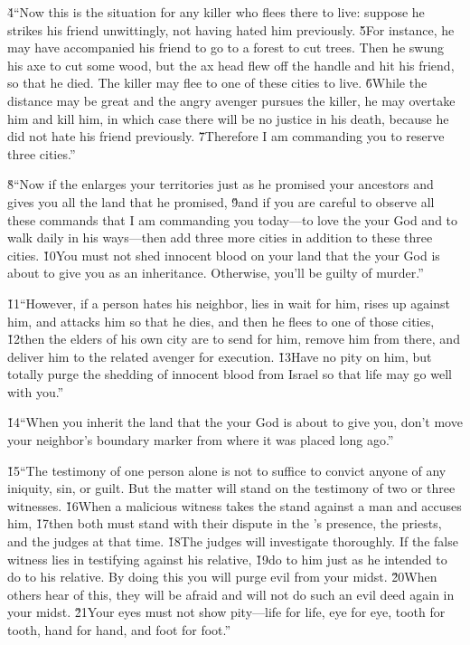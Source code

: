 \v{4}``Now this is the situation for any killer who flees there to live: suppose he strikes his friend unwittingly, not having hated him previously. \v{5}For instance, he may have accompanied his friend to go to a forest to cut trees. Then he swung his axe to cut some wood, but the ax head flew off the handle and hit his friend, so that he died. The killer may flee to one of these cities to live. \v{6}While the distance may be great and the angry avenger pursues the killer, he may overtake him and kill him, in which case there will be no justice in his death, because he did not hate his friend previously. \v{7}Therefore I am commanding you to reserve three cities.''

\v{8}``Now if the  enlarges your territories just as he promised your ancestors and gives you all the land that he promised, \v{9}and if you are careful to observe all these commands that I am commanding you today---to love the  your God and to walk daily in his ways---then add three more cities in addition to these three cities. \v{10}You must not shed innocent blood on your land that the  your God is about to give you as an inheritance. Otherwise, you'll be guilty of murder.''

\v{11}``However, if a person hates his neighbor, lies in wait for him, rises up against him, and attacks him so that he dies, and then he flees to one of those cities, \v{12}then the elders of his own city are to send for him, remove him from there, and deliver him to the related avenger for execution. \v{13}Have no pity on him, but totally purge the shedding of innocent blood from Israel so that life may go well with you.''

\v{14}``When you inherit the land that the  your God is about to give you, don't move your neighbor's boundary marker from where it was placed long ago.''

\v{15}``The testimony of one person alone is not to suffice to convict anyone of any iniquity, sin, or guilt. But the matter will stand on the testimony of two or three witnesses. \v{16}When a malicious witness takes the stand against a man and accuses him, \v{17}then both must stand with their dispute in the 's presence, the priests, and the judges at that time. \v{18}The judges will investigate thoroughly. If the false witness lies in testifying against his relative, \v{19}do to him just as he intended to do to his relative. By doing this you will purge evil from your midst. \v{20}When others hear of this, they will be afraid and will not do such an evil deed again in your midst. \v{21}Your eyes must not show pity---life for life, eye for eye, tooth for tooth, hand for hand, and foot for foot.''

